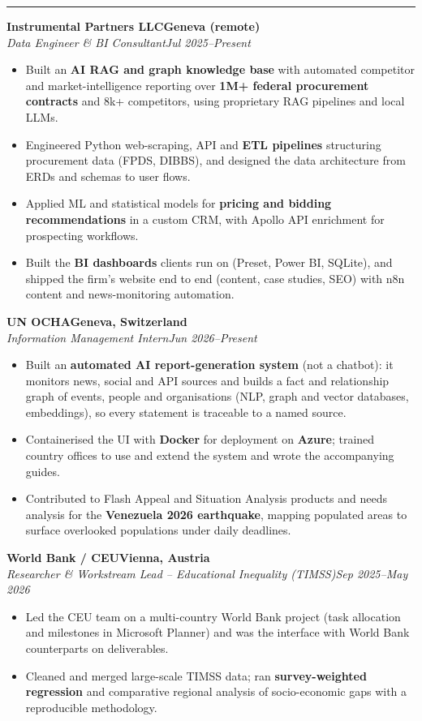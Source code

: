 \documentclass[11pt,a4paper]{article}
\newcommand{\cvsection}[1]{\vspace{5pt}{\centering\textbf{\large \MakeUppercase{#1}}\par}\vspace{2pt}\hrule\vspace{4pt}}
\newcommand{\cventryhead}[4]{\needspace{4\baselineskip}\textbf{#1}\hfill\textbf{#2}\\\textit{#3}\hfill\textit{#4}\par\vspace{1pt}}
\begin{document}
\cvsection{Professional Experience}
\cventryhead{Instrumental Partners LLC}{Geneva (remote)}{Data Engineer \& BI Consultant}{Jul 2025--Present}
\begin{itemize}
\item Built an \textbf{AI RAG and graph knowledge base} with automated competitor and market-intelligence reporting over \textbf{1M+ federal procurement contracts} and 8k+ competitors, using proprietary RAG pipelines and local LLMs.
\item Engineered Python web-scraping, API and \textbf{ETL pipelines} structuring procurement data (FPDS, DIBBS), and designed the data architecture from ERDs and schemas to user flows.
\item Applied ML and statistical models for \textbf{pricing and bidding recommendations} in a custom CRM, with Apollo API enrichment for prospecting workflows.
\item Built the \textbf{BI dashboards} clients run on (Preset, Power BI, SQLite), and shipped the firm's website end to end (content, case studies, SEO) with n8n content and news-monitoring automation.
\end{itemize}

\cventryhead{UN OCHA}{Geneva, Switzerland}{Information Management Intern}{Jun 2026--Present}
\begin{itemize}
\item Built an \textbf{automated AI report-generation system} (not a chatbot): it monitors news, social and API sources and builds a fact and relationship graph of events, people and organisations (NLP, graph and vector databases, embeddings), so every statement is traceable to a named source.
\item Containerised the UI with \textbf{Docker} for deployment on \textbf{Azure}; trained country offices to use and extend the system and wrote the accompanying guides.
\item Contributed to Flash Appeal and Situation Analysis products and needs analysis for the \textbf{Venezuela 2026 earthquake}, mapping populated areas to surface overlooked populations under daily deadlines.
\end{itemize}

\cventryhead{World Bank / CEU}{Vienna, Austria}{Researcher \& Workstream Lead -- Educational Inequality (TIMSS)}{Sep 2025--May 2026}
\begin{itemize}
\item Led the CEU team on a multi-country World Bank project (task allocation and milestones in Microsoft Planner) and was the interface with World Bank counterparts on deliverables.
\item Cleaned and merged large-scale TIMSS data; ran \textbf{survey-weighted regression} and comparative regional analysis of socio-economic gaps with a reproducible methodology.
\end{itemize}
\end{document}
